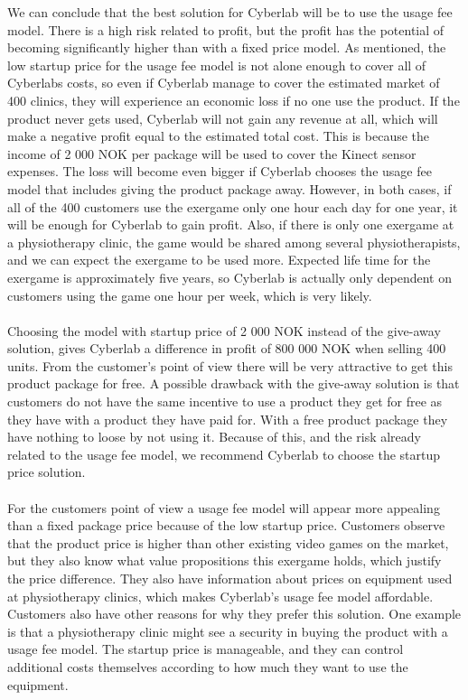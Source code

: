 We can conclude that the best solution for Cyberlab will be to use the usage fee model. There is a high risk related to profit, but the profit has the potential of becoming significantly higher than with a fixed price model. As mentioned, the low startup price for the usage fee model is not alone enough to cover all of Cyberlabs costs, so even if Cyberlab manage to cover the estimated market of 400 clinics, they will experience an economic loss if no one use the product. If the product never gets used, Cyberlab will not gain any revenue at all, which will make a negative profit equal to the estimated total cost. This is because the income of 2 000 NOK per package will be used to cover the Kinect sensor expenses. The loss will become even bigger if Cyberlab chooses the usage fee model that includes giving the product package away. However, in both cases, if all of the 400 customers use the exergame only one hour each day for one year, it will be enough for Cyberlab to gain profit. Also, if there is only one exergame at a physiotherapy clinic, the game would be shared among several physiotherapists, and we can expect the exergame to be used more. Expected life time for the exergame is approximately five years, so Cyberlab is actually only dependent on customers using the game one hour per week, which is very likely. \\ \\   
Choosing the model with startup price of 2 000 NOK instead of the give-away solution, gives Cyberlab a difference in profit of 800 000 NOK when selling 400 units. From the customer's point of view there will be very attractive to get this product package for free. A possible drawback with the give-away solution is that customers do not have the same incentive to use a product they get for free as they have with a product they have paid for. With a free product package they have nothing to loose by not using it. Because of this, and the risk already related to the usage fee model, we recommend Cyberlab to choose the startup price solution. \\ \\ 
For the customers point of view a usage fee model will appear more appealing than a fixed package price because of the low startup price. Customers observe that the product price is higher than other existing video games on the market, but they also know what value propositions this exergame holds, which justify the price difference. They also have information about prices on equipment used at physiotherapy clinics, which makes Cyberlab’s usage fee model affordable. Customers also have other reasons for why they prefer this solution. One example is that a physiotherapy clinic might see a security in buying the product with a usage fee model. The startup price is manageable, and they can control additional costs themselves according to how much they want to use the equipment. \\ \\
